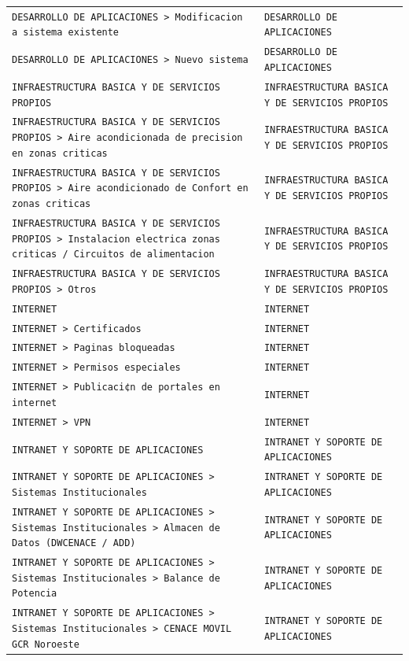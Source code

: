 \begin{longtable}{>{\raggedright\arraybackslash}p{} >{\raggedright\arraybackslash}p{}}
\texttt{DESARROLLO DE APLICACIONES > Modificacion a sistema existente} & \texttt{DESARROLLO DE APLICACIONES} \\
\texttt{DESARROLLO DE APLICACIONES > Nuevo sistema} & \texttt{DESARROLLO DE APLICACIONES} \\
\texttt{INFRAESTRUCTURA BASICA Y DE SERVICIOS PROPIOS} & \texttt{INFRAESTRUCTURA BASICA Y DE SERVICIOS PROPIOS} \\
\texttt{INFRAESTRUCTURA BASICA Y DE SERVICIOS PROPIOS > Aire acondicionada de precision en zonas criticas} & \texttt{INFRAESTRUCTURA BASICA Y DE SERVICIOS PROPIOS} \\
\texttt{INFRAESTRUCTURA BASICA Y DE SERVICIOS PROPIOS > Aire acondicionado de Confort en zonas criticas} & \texttt{INFRAESTRUCTURA BASICA Y DE SERVICIOS PROPIOS} \\
\texttt{INFRAESTRUCTURA BASICA Y DE SERVICIOS PROPIOS > Instalacion electrica zonas criticas / Circuitos de alimentacion} & \texttt{INFRAESTRUCTURA BASICA Y DE SERVICIOS PROPIOS} \\
\texttt{INFRAESTRUCTURA BASICA Y DE SERVICIOS PROPIOS > Otros} & \texttt{INFRAESTRUCTURA BASICA Y DE SERVICIOS PROPIOS} \\
\texttt{INTERNET} & \texttt{INTERNET} \\
\texttt{INTERNET > Certificados} & \texttt{INTERNET} \\
\texttt{INTERNET > Paginas bloqueadas} & \texttt{INTERNET} \\
\texttt{INTERNET > Permisos especiales} & \texttt{INTERNET} \\
\texttt{INTERNET > Publicaci¢n de portales en internet} & \texttt{INTERNET} \\
\texttt{INTERNET > VPN} & \texttt{INTERNET} \\
\texttt{INTRANET Y SOPORTE DE APLICACIONES} & \texttt{INTRANET Y SOPORTE DE APLICACIONES} \\
\texttt{INTRANET Y SOPORTE DE APLICACIONES > Sistemas Institucionales} & \texttt{INTRANET Y SOPORTE DE APLICACIONES} \\
\texttt{INTRANET Y SOPORTE DE APLICACIONES > Sistemas Institucionales > Almacen de Datos (DWCENACE / ADD)} & \texttt{INTRANET Y SOPORTE DE APLICACIONES} \\
\texttt{INTRANET Y SOPORTE DE APLICACIONES > Sistemas Institucionales > Balance de Potencia} & \texttt{INTRANET Y SOPORTE DE APLICACIONES} \\
\texttt{INTRANET Y SOPORTE DE APLICACIONES > Sistemas Institucionales > CENACE MOVIL GCR Noroeste} & \texttt{INTRANET Y SOPORTE DE APLICACIONES} \\

\end{longtable}
